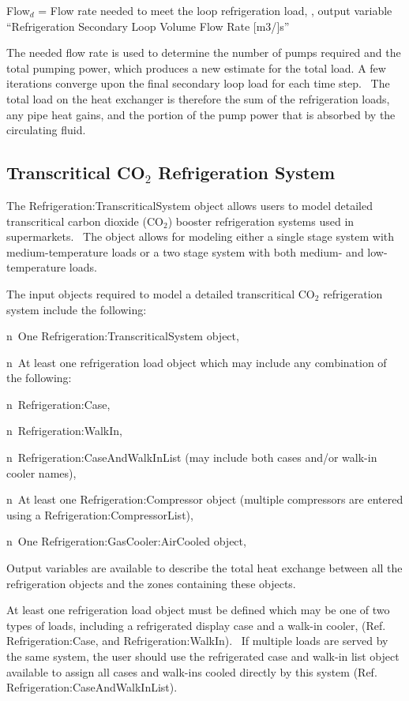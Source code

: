 Flow\(_{d}\) = Flow rate needed to meet the loop refrigeration load, , output variable ``Refrigeration Secondary Loop Volume Flow Rate {[}m3/{]}s''

The needed flow rate is used to determine the number of pumps required and the total pumping power, which produces a new estimate for the total load. A few iterations converge upon the final secondary loop load for each time step.~ The total load on the heat exchanger is therefore the sum of the refrigeration loads, any pipe heat gains, and the portion of the pump power that is absorbed by the circulating fluid.

\subsection{\texorpdfstring{Transcritical CO\(_{2}\) Refrigeration System}{Transcritical CO\_\{2\} Refrigeration System}}\label{transcritical-coux5f2-refrigeration-system}

The Refrigeration:TranscriticalSystem object allows users to model detailed transcritical carbon dioxide (CO\(_{2}\)) booster refrigeration systems used in supermarkets.~ The object allows for modeling either a single stage system with medium-temperature loads or a two stage system with both medium- and low-temperature loads.

The input objects required to model a detailed transcritical CO\(_{2}\) refrigeration system include the following:

n~One Refrigeration:TranscriticalSystem object,

n~At least one refrigeration load object which may include any combination of the following:

n~Refrigeration:Case,

n~Refrigeration:WalkIn,

n~Refrigeration:CaseAndWalkInList (may include both cases and/or walk-in cooler names),

n~At least one Refrigeration:Compressor object (multiple compressors are entered using a Refrigeration:CompressorList),

n~One Refrigeration:GasCooler:AirCooled object,

Output variables are available to describe the total heat exchange between all the refrigeration objects and the zones containing these objects.

At least one refrigeration load object must be defined which may be one of two types of loads, including a refrigerated display case and a walk-in cooler, (Ref. Refrigeration:Case, and Refrigeration:WalkIn).~ If multiple loads are served by the same system, the user should use the refrigerated case and walk-in list object available to assign all cases and walk-ins cooled directly by this system (Ref. Refrigeration:CaseAndWalkInList).

